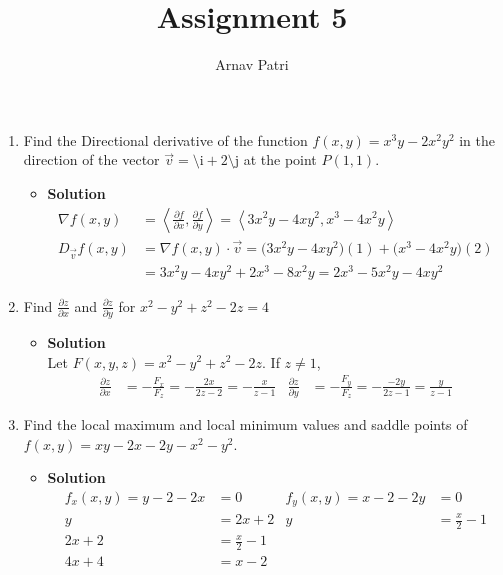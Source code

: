\documentclass[11pt]{article}
\title{Assignment 5}
\author{Arnav Patri}
\newcommand{\pder}[2]{\frac{\partial #1}{\partial #2}}
\newcommand{\vi}{\text{\^\i}}
\newcommand{\vj}{\text{\^\j}}
\begin{document}
	\maketitle
		\thispagestyle{empty}
		\begin{enumerate}
			\item
				Find the Directional derivative of the function $f(x, y) = x^3y - 2x^2y^2$ in the direction of the vector $\vec{v} = \vi + 2\vj$ at the point $P(1, 1)$.
				\begin{itemize}[ ]
					\item \textbf{Solution}
						\begin{align*}
							\nabla f(x, y) &= \left\langle \pder{f}{x}, \pder{f}{y} \right\rangle
									= \left\langle 3x^2y - 4xy^2, x^3 - 4x^2y \right\rangle \\
							D_{\vec{v}}f(x, y) &= \nabla f(x, y) \cdot \vec{v}
									= \bigl(3x^2y -4xy^2\bigr)(1) + \bigl(x^3 - 4x^2y\bigl)(2) \\
								&= 3x^2y - 4xy^2 + 2x^3 - 8x^2y
									= 2x^3 - 5x^2y - 4xy^2
						\end{align*}
				\end{itemize}
			\item
				Find $\pder{z}{x}$ and $\pder{z}{y}$ for $x^2 - y^2 + z^2 - 2z = 4$
				\begin{itemize}[ ]
					\item \textbf{Solution} \\
						Let $F(x, y, z) = x^2 - y^2 + z^2 - 2z$. If $z \ne 1$,
						\begin{align*}
							\pder{z}{x} &= -\frac{F_x}{F_z}
									= -\frac{2x}{2z - 2}
									= -\frac{x}{z - 1} &
							\pder{z}{y} &= -\frac{F_y}{F_z}
									= -\frac{-2y}{2z - 1}
									= \frac{y}{z - 1} 
						\end{align*}
				\end{itemize}
			\item
				Find the local maximum and local minimum values and saddle points of $f(x, y) = xy - 2x - 2y - x^2 - y^2$.
				\begin{itemize}[ ]
					\item \textbf{Solution}
						\begin{align*}
							f_x(x, y) = y - 2 - 2x &= 0 &
									f_y(x, y) = x - 2 - 2y &= 0 \\
								y &= 2x + 2 &
									y &= \frac{x}{2} - 1 \\
								2x + 2 &= \frac{x}{2} - 1 \\
								4x + 4 &= x - 2 \\

\end{align*}
\end{itemize}
\end{enumerate}
\end{document}

